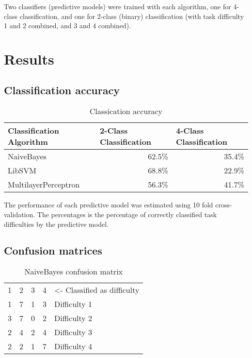 \documentclass[12pt,leqno,letterpaper]{report} %
\begin{document}
Two classifiers (predictive models) were trained with each algorithm, one for 4-class classification, and one for 2-class (binary) classification (with task difficulty 1 and 2 combined, and 3 and 4 combined).


\chapter{Results}
\section{Classification accuracy}
\begin{table}[h]
\caption {Classication accuracy} 
\center
\begin{tabular}{@{}lrr@{}}
\toprule
Classification Algorithm & \multicolumn{1}{l}{2-Class Classification} & \multicolumn{1}{l}{4-Class Classification} \\ \midrule
NaiveBayes               & 62.5\%                                     & 35.4\%                                     \\
LibSVM                   & 68.8\%                                     & 22.9\%                                     \\
MultilayerPerceptron     & 56.3\%                                     & 41.7\%                                     \\ \bottomrule
\end{tabular}
\end{table}

The performance of each predictive model was estimated using 10 fold cross-validation. The percentages is the percentage of correctly classified task difficulties by the predictive model.
\pagebreak

\section{Confusion matrices}

\begin{table}[h]
\caption {NaiveBayes confusion matrix} 
\center
\begin{tabular}{ccccl}
\multicolumn{1}{l}{1} & \multicolumn{1}{l}{2} & \multicolumn{1}{l}{3} & \multicolumn{1}{l}{4} & \small{\textless- Classified as difficulty} \\ \cline{1-4}
1                          & 7                          & 1                          & \multicolumn{1}{c|}{3}     & Difficulty 1                    \\
3                          & 7                          & 0                          & \multicolumn{1}{c|}{2}     & Difficulty 2                    \\
2                          & 4                          & 2                          & \multicolumn{1}{c|}{4}     & Difficulty 3                    \\
2                          & 2                          & 1                          & \multicolumn{1}{c|}{7}     & Difficulty 4                   
\end{tabular}
\end{table}
\end{document}
